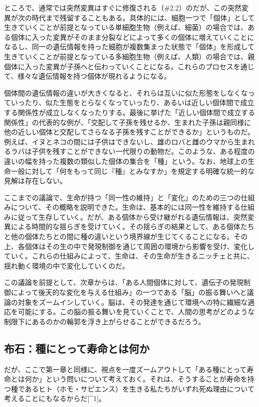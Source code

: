 ところで、通常では突然変異はすぐに修復される（\#2.2）のだが、この突然変異が次の時代まで残留することもある。具体的には、細胞一つで「個体」として生きていくことが前提となっている単細胞生物（例えば、細菌）の場合では、ある個体に入った変異がそのまま分裂などによって多くの個体に増えていくことになるし、同一の遺伝情報を持った細胞が複数集まった状態で「個体」を形成して生きていくことが前提となっている多細胞生物（例えば、人類）の場合では、親個体に入った変異が子孫へと伝わっていくことになる。これらのプロセスを通じて、様々な遺伝情報を持つ個体が現れるようになる。

個体間の遺伝情報の違いが大きくなると、それらは互いに似た形態をしなくなっていったり、似た生態をとらなくなっていったり、あるいは近しい個体間で成立する関係性が成立しなくなったりする。最後に挙げた「近しい個体間で成立する関係性」の代表的な例が、「交配して子孫を残せるか、生まれた子孫は親同様に他の近しい個体と交配してさらなる子孫を残すことができるか」というものだ。例えば、イヌとネコの間には子供はできないし、雄のロバと雌のウマから生まれるラバは子供を残すことができない一代限りの動物だ。このような、ある程度の違いの幅を持った複数の類似した個体の集合を「種」という。なお、地球上の生命一般に対して「何をもって同じ『種』とみなすか」を規定する明確な統一的な見解は存在しない。

ここまでの議論で、生命が持つ「同一性の維持」と「変化」のための三つの仕組みについて、その概略を説明できた。生命は、基本的には同一性を維持する仕組みに従って生存していく。だが、ある個体から受け継がれる遺伝情報は、突然変異による時間的な揺らぎを受けていく。その揺らぎの結果として、ある個体たちと他の個体たちとの間に種の違いという境界線が生じてくることになる。その上、各個体はその生の中で発現制御を通じて周囲の環境から影響を受け、変化していく。これらの仕組みによって、生命は、その生命が生きるニッチェと共に、揺れ動く環境の中で変化していくのだ。

この議論を前提として、次章からは、「ある人間個体に対して、遺伝子の発現制御によって後天的な変化を与える仕組み」の一つである「脳」の振る舞いへと議論の対象をズームインしていく。脳は、その発達を通じて環境への特に繊細な適応を可能にする。この脳の振る舞いを見ていくことで、人間の思考がどのような制限下にあるのかの輪郭を浮き上がらせることができるだろう。

\subsection{布石：種にとって寿命とは何か}\label{ux5e03ux77f3ux7a2eux306bux3068ux3063ux3066ux5bffux547dux3068ux306fux4f55ux304b}

だが、ここで第一章と同様に、視点を一度ズームアウトして「ある種にとって寿命とは何か」という問いについて考えておく。それは、そうすることが寿命を持つ種であるヒト（ホモ・サピエンス）を生きる私たちがいずれ死ぬ理由について考えることにもなるからだ{[}\^{}1{]}。

